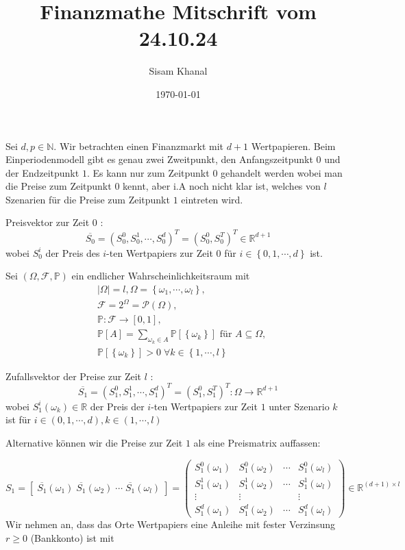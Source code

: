 \documentclass[11.5 pt, a4paper]{memoir}
\title{Finanzmathe Mitschrift vom 24.10.24}
\author{Sisam Khanal}
\date{\today}
\begin{document}
\raggedright
\color{Black}
\maketitle


Sei $ d,p \in \mathbb{N} $. Wir betrachten einen Finanzmarkt mit $ d+1 $ Wertpapieren. Beim Einperiodenmodell gibt es genau zwei Zweitpunkt, den Anfangszeitpunkt $ 0 $ und der Endzeitpunkt $ 1 $. Es kann nur zum Zeitpunkt $ 0 $ gehandelt werden
wobei man die Preise zum Zeitpunkt $ 0 $  kennt, aber i.A noch nicht klar ist, welches von $ l $ Szenarien für die Preise zum Zeitpunkt $ 1 $ eintreten wird. \break

Preisvektor zur Zeit $ 0 $ :
$$ \overline{ S_0} = \left( S_0^0, S_0^1 , \cdots,  S_0^d \right)^T = \left( S_0^0, S_0^T \right)^T \in \mathbb{R}^{d+1}  $$
wobei $ S_0^i $ der Preis des $ i $-ten Wertpapiers zur Zeit $ 0 $ für $ i \in \left\{ 0, 1 , \cdots,  d \right\}  $ ist.\break

Sei $ \left( \Omega , \mathcal{F}, \mathbb{P}  \right)$ ein endlicher Wahrscheinlichkeitsraum mit 
\begin{align*}
	&\left| \Omega  \right| = l,  \Omega  = \left\{ \omega_1 , \cdots, \omega_l \right\}, \\
	&	\mathcal{F} = 2^{\Omega } = \mathcal{P} \left( \Omega  \right),\\
	&	\mathbb{P} : \mathcal{F} \to \left[ 0, 1 \right],\\
	&	\mathbb{P} [A] = \sum_{\omega_k \in A} \mathbb{P} \left[ \left\{ \omega_k \right\}  \right]  \text{ für  } A \subseteq \Omega,\\
	&	\mathbb{P} \left[ \left\{ \omega_k \right\}  \right]  > 0 \;  \forall k \in \left\{ 1 , \cdots, l \right\} 
\end{align*}

Zufallsvektor der Preise zur Zeit $ l $ :
$$ \overline{ S_1} = \left( S_1^0, S_1^1 , \cdots,  S_1^d\right) ^{T} = \left( S_1^0, S_1^T \right)^{T} : \Omega \to \mathbb{R}^{d+1}  $$
wobei $ S_1^i \left( \omega_k \right) \in \mathbb{R} $ der Preis der $ i $-ten Wertpapiers zur Zeit $ 1 $ unter Szenario $ k $ ist für $ i \in \left( 0,1 , \cdots,  d \right) , k \in \left( 1 , \cdots,  l \right)  $ 

Alternative können wir die Preise zur Zeit $ 1 $ als eine Preismatrix auffassen:

$$ S_1 = \left[ \;  \overline{ S_1} (\omega_1) \;  \overline{ S_1} (\omega_2) \; \cdots \;  \overline{ S_1} (\omega_l) \;  \right] =  \begin{pmatrix}
	S_1^0 (\omega_1) & S_1^0 (\omega_2) & \cdots & S_1^0 (\omega_l) \\
	S_1^1 (\omega_1) & S_1^1 (\omega_2) & \cdots & S_1^1 (\omega_l) \\
	\vdots & \vdots & & \vdots \\
	S_1^d (\omega_1) & S_1^d (\omega_2) & \cdots & S_1^d (\omega_l) 
\end{pmatrix} \in \mathbb{R}^{(d+1) \times l}
 $$
Wir nehmen an, dass das Orte Wertpapiers eine Anleihe mit fester Verzinsung $ r \geq 0 $ (Bankkonto) ist mit 
\end{document}
